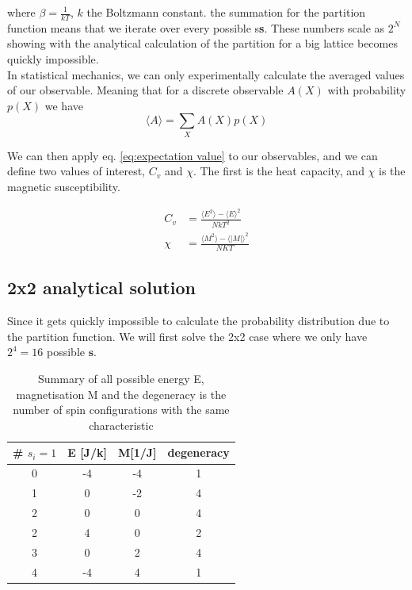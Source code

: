 \documentclass[english,notitlepage,reprint,nofootinbib]{revtex4-2}  %
\begin{document}
	where $\beta = \frac{1}{kT}$, $k$ the Boltzmann constant. the summation for the partition
	function means that we iterate over every possible s\textbf{s}. These numbers scale as $2^N$
	showing with the analytical calculation of the partition for a big lattice becomes quickly
	impossible. \\

	In statistical mechanics, we can only experimentally calculate the averaged values of our
	observable. Meaning that for a discrete observable $A(X)$ with probability $p(X)$ we have
	\begin{equation}
		\langle A \rangle = \sum_{X}A(X)p(X) \label{eq:expectation value}
	\end{equation}

	We can then apply eq. \ref{eq:expectation value} to our observables, and we can define two
	values of interest, $C_v$ and $\chi$. The first is the heat capacity, and $\chi$ is the
	magnetic susceptibility.

	\begin{align}
		C_v &= \frac{\langle E^2 \rangle - \langle E \rangle^2}{NkT^2} \label{eq:heat_capacity} \\
		\chi &= \frac{\langle M^2 \rangle - \langle |M| \rangle^2}{NKT} \label{eq:susceptibility}
	\end{align}

	\subsection{2x2 analytical solution}\label{subsec:analytical solution}

	Since it gets quickly impossible to calculate the probability distribution due to the
	partition function. We will first solve the 2x2 case where we only have $2^4=16$ possible
	$\textbf{s}$.

	\begin{table}[h!]
	\centering
	\begin{tabular}{|c|c|c|c|}
		\hline
		\# $s_i=1$ & E [J/k] & M[1/J] & degeneracy \\
		\hline
		\hline
		0 & -4 &  -4 &  1  \\
		1 & 0&   -2&   4  \\
		2 & 0 & 0&  4  \\
		2 & 4 & 0 &  2 \\
		3 & 0  & 2 & 4 \\
		4 & -4 & 4 & 1 \\
		\hline
	\end{tabular}
	\caption{ Summary of all possible energy E, magnetisation M and the degeneracy is the
	number of spin configurations with the same characteristic} \label{tab:summary2x2}
	\end{table}
\end{document}
